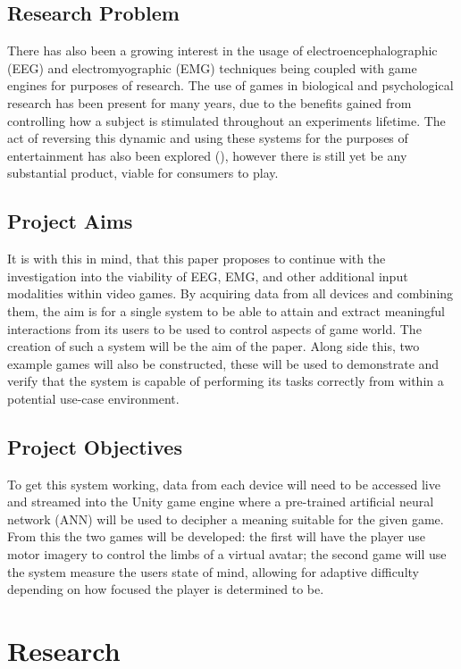 \documentclass[11pt, a4paper]{article}
\newcommand{\citethis}[1]{(\cite{#1})}
\begin{document}
\subsection{Research Problem}
There has also been a growing interest in the usage of electroencephalographic (EEG) and electromyographic (EMG) techniques being coupled with game engines for purposes of research. The use of games in biological and psychological research has been present for many years, due to the benefits gained from controlling how a subject is stimulated throughout an experiments lifetime. The act of reversing this dynamic and using these systems for the purposes of entertainment has also been explored \citethis{6518141}, however there is still yet be any substantial product, viable for consumers to play. 

\subsection{Project Aims}
It is with this in mind, that this paper proposes to continue with the investigation into the viability of EEG, EMG, and other additional input modalities within video games. By acquiring data from all devices and combining them, the aim is for a single system to be able to attain and extract meaningful interactions from its users to be used to control aspects of game world. The creation of such a system will be the aim of the paper. Along side this, two example games will also be constructed, these will be used to demonstrate and verify that the system is capable of performing its tasks correctly from within a potential use-case environment.

\subsection{Project Objectives}
To get this system working, data from each device will need to be accessed live and streamed into the Unity game engine where a pre-trained artificial neural network (ANN) will be used to decipher a meaning suitable for the given game. From this the two games will be developed: the first will have the player use motor imagery to control the limbs of a virtual avatar; the second game will use the system measure the users state of mind, allowing for adaptive difficulty depending on how focused the player is determined to be.



\pagebreak
\section{Research}	
\end{document}
